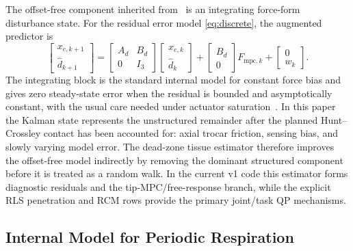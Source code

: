 The offset-free component inherited from~\cite{cao2026phri} is an integrating force-form disturbance state. For the residual error model \eqref{eq:discrete}, the augmented predictor is
\begin{equation}
\begin{bmatrix}x_{e,k+1}\\ \hat d_{k+1}\end{bmatrix}=
\begin{bmatrix}A_d&B_d\\0&I_3\end{bmatrix}
\begin{bmatrix}x_{e,k}\\ \hat d_k\end{bmatrix}
+\begin{bmatrix}B_d\\0\end{bmatrix}F_{\mathrm{mpc},k}
+\begin{bmatrix}0\\w_k\end{bmatrix}.
\label{eq:aug}
\end{equation}
The integrating block is the standard internal model for constant force bias and gives zero steady-state error when the residual is bounded and asymptotically constant, with the usual care needed under actuator saturation~\cite{cao2004antiwindup}. In this paper the Kalman state represents the unstructured remainder after the planned Hunt--Crossley contact has been accounted for: axial trocar friction, sensing bias, and slowly varying model error. The dead-zone tissue estimator therefore improves the offset-free model indirectly by removing the dominant structured component before it is treated as a random walk. In the current v1 code this estimator forms diagnostic residuals and the tip-MPC/free-response branch, while the explicit RLS penetration and RCM rows provide the primary joint/task QP mechanisms.

\subsection{Internal Model for Periodic Respiration}\label{sec:osc}

